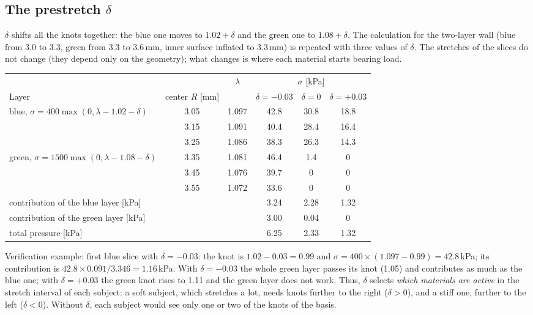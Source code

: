 \subsection{The prestretch $\delta$}
$\delta$ shifts all the knots together: the blue one moves to $1.02+\delta$ and the green one to $1.08+\delta$. The calculation for the two-layer wall (blue from 3.0 to 3.3, green from 3.3 to 3.6\,mm, inner surface inflated to 3.3\,mm) is repeated with three values of $\delta$. The stretches of the slices do not change (they depend only on the geometry); what changes is where each material starts bearing load.
\begin{center}\small
\begin{tabular}{lccccc}\toprule
 & & $\lambda$ & \multicolumn{3}{c}{$\sigma$ [kPa]}\\\cmidrule(lr){4-6}
Layer & center $R$ [mm] & & $\delta=-0.03$ & $\delta=0$ & $\delta=+0.03$\\\midrule
blue, $\sigma=400\max(0,\lambda-1.02-\delta)$ & 3.05 & 1.097 & 42.8 & 30.8 & 18.8\\
 & 3.15 & 1.091 & 40.4 & 28.4 & 16.4\\
 & 3.25 & 1.086 & 38.3 & 26.3 & 14.3\\
green, $\sigma=1500\max(0,\lambda-1.08-\delta)$ & 3.35 & 1.081 & 46.4 & 1.4 & 0\\
 & 3.45 & 1.076 & 39.7 & 0 & 0\\
 & 3.55 & 1.072 & 33.6 & 0 & 0\\\midrule
\multicolumn{3}{l}{contribution of the blue layer [kPa]} & 3.24 & 2.28 & 1.32\\
\multicolumn{3}{l}{contribution of the green layer [kPa]} & 3.00 & 0.04 & 0\\
\multicolumn{3}{l}{total pressure [kPa]} & 6.25 & 2.33 & 1.32\\\bottomrule
\end{tabular}
\end{center}
Verification example: first blue slice with $\delta=-0.03$: the knot is $1.02-0.03=0.99$ and $\sigma=400\times(1.097-0.99)=42.8$\,kPa; its contribution is $42.8\times0.091/3.346=1.16$\,kPa. With $\delta=-0.03$ the whole green layer passes its knot (1.05) and contributes as much as the blue one; with $\delta=+0.03$ the green knot rises to 1.11 and the green layer does not work. Thus, $\delta$ selects \emph{which materials are active} in the stretch interval of each subject: a soft subject, which stretches a lot, needs knots further to the right ($\delta>0$), and a stiff one, further to the left ($\delta<0$). Without $\delta$, each subject would see only one or two of the knots of the basis.
